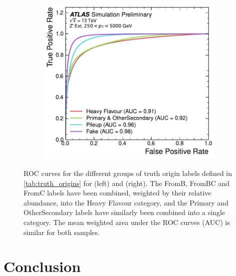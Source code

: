 \begin{figure}[!htbp]
\begin{subfigure}[b]{0.48\textwidth}
        \includegraphics[width=\textwidth]{chapters/gnn_tagger/figs/results/tracks/zprime/zprime_origin_roc_GNNv11.pdf}
    \end{subfigure}
    \caption{ROC curves for the different groups of truth origin labels defined in \cref{tab:truth_origins} for \ttbarjets (left) and \Zprimejets (right).
             The FromB, FromBC and FromC labels have been combined, weighted by their relative abundance, into the Heavy Flavour category, and the Primary and OtherSecondary labels have similarly been combined into a single category.
             The mean weighted area under the ROC curves (AUC) is similar for both samples.}
    \label{fig:track_origin_roc}
\end{figure}


\section{Conclusion}\label{sec:gnn_conclusion}


